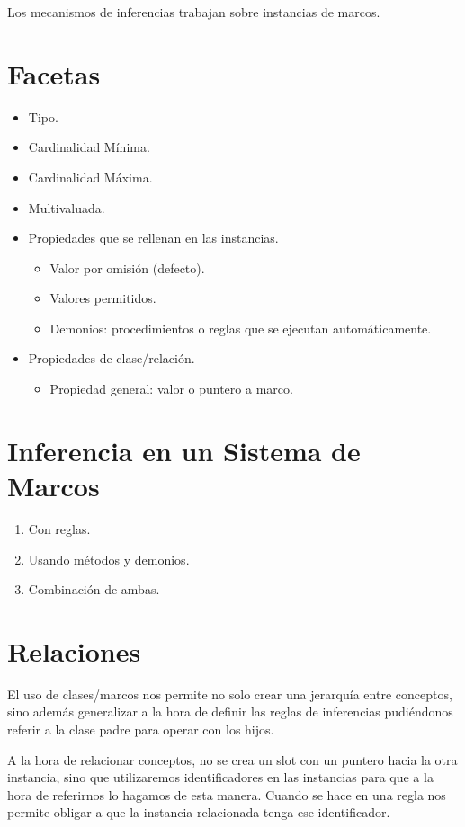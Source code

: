 \documentclass[12pt, twoside, openright]{report} %
\begin{document}
Los mecanismos de inferencias trabajan sobre instancias de marcos.

\section{Facetas}
\begin{itemize}
    \item Tipo.
    \item Cardinalidad Mínima.
    \item Cardinalidad Máxima. 
    \item Multivaluada. 
    \item Propiedades que se rellenan en las instancias.
\begin{itemize}
    \item Valor por omisión (defecto).
    \item Valores permitidos.
    \item Demonios: procedimientos o reglas que se ejecutan automáticamente.
\end{itemize}
\item Propiedades de clase/relación.
\begin{itemize}
    \item Propiedad general: valor o puntero a marco.
\end{itemize}
\end{itemize}

\section{Inferencia en un Sistema de Marcos}
\begin{enumerate}
	\item Con reglas.
	\item Usando métodos y demonios.
	\item Combinación de ambas.
\end{enumerate}

\section{Relaciones}
El uso de clases/marcos nos permite no solo crear una jerarquía entre conceptos, sino además generalizar a la hora de definir las reglas de inferencias pudiéndonos referir a la clase padre para operar con los hijos.

A la hora de relacionar conceptos, no se crea un slot con un puntero hacia la otra instancia, sino que utilizaremos identificadores en las instancias para que a la hora de referirnos lo hagamos de esta manera. Cuando se hace en una regla nos permite obligar a que la instancia relacionada tenga ese identificador.
\end{document}

